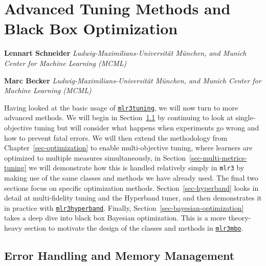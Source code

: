 \hypertarget{sec-optimization-advanced}{%
\chapter{Advanced Tuning Methods and Black Box Optimization}\label{sec-optimization-advanced}}

\vspace{-15mm}

\textbf{Lennart Schneider} \newline 
\emph{Ludwig-Maximilians-Universität München, and Munich Center for
Machine Learning (MCML)}

\textbf{Marc Becker} \newline  \emph{Ludwig-Maximilians-Universität
München, and Munich Center for Machine Learning (MCML)}
\newline \newline 

Having looked at the basic usage of
\href{https://mlr3tuning.mlr-org.com}{\texttt{mlr3tuning}},
we will now turn to more advanced methods. We will begin in
Section~\ref{sec-tuning-errors} by continuing to look at
single-objective tuning but will consider what happens when experiments
go wrong and how to prevent fatal errors. We will then
extend the methodology from Chapter~\ref{sec-optimization} to enable
multi-objective tuning, where learners are
optimized to multiple measures simultaneously, in
Section~\ref{sec-multi-metrics-tuning} we will demonstrate how this is
handled relatively simply in \texttt{mlr3} by making use of the same
classes and methods we have already used. The final two sections focus
on specific optimization methods. Section~\ref{sec-hyperband} looks in
detail at multi-fidelity tuning and the Hyperband tuner, and then
demonstrates it in practice with
\href{https://mlr3hyperband.mlr-org.com}{\texttt{mlr3hyperband}}.
Finally, Section~\ref{sec-bayesian-optimization} takes a deep dive into
black box Bayesian optimization. This is a more theory-heavy section to
motivate the design of the classes and methods in
\href{https://mlr3mbo.mlr-org.com}{\texttt{mlr3mbo}}.

\hypertarget{sec-tuning-errors}{%
\section{Error Handling and Memory Management}\label{sec-tuning-errors}}

